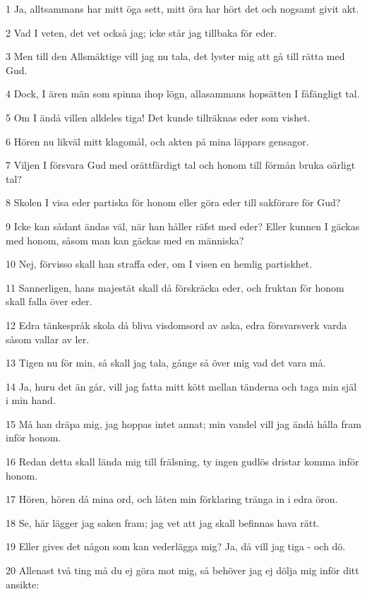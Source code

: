 \par 1 Ja, alltsammans har mitt öga sett, mitt öra har hört det och nogsamt givit akt.
\par 2 Vad I veten, det vet också jag; icke står jag tillbaka för eder.
\par 3 Men till den Allsmäktige vill jag nu tala, det lyster mig att gå till rätta med Gud.
\par 4 Dock, I ären män som spinna ihop lögn, allasammans hopsätten I fåfängligt tal.
\par 5 Om I ändå villen alldeles tiga! Det kunde tillräknas eder som vishet.
\par 6 Hören nu likväl mitt klagomål, och akten på mina läppars gensagor.
\par 7 Viljen I försvara Gud med orättfärdigt tal och honom till förmån bruka oärligt tal?
\par 8 Skolen I visa eder partiska för honom eller göra eder till sakförare för Gud?
\par 9 Icke kan sådant ändas väl, när han håller räfst med eder? Eller kunnen I gäckas med honom, såsom man kan gäckas med en människa?
\par 10 Nej, förvisso skall han straffa eder, om I visen en hemlig partiskhet.
\par 11 Sannerligen, hans majestät skall då förskräcka eder, och fruktan för honom skall falla över eder.
\par 12 Edra tänkespråk skola då bliva visdomsord av aska, edra försvarsverk varda såsom vallar av ler.
\par 13 Tigen nu för min, så skall jag tala, gånge så över mig vad det vara må.
\par 14 Ja, huru det än går, vill jag fatta mitt kött mellan tänderna och taga min själ i min hand.
\par 15 Må han dräpa mig, jag hoppas intet annat; min vandel vill jag ändå hålla fram inför honom.
\par 16 Redan detta skall lända mig till frälsning, ty ingen gudlös dristar komma inför honom.
\par 17 Hören, hören då mina ord, och låten min förklaring tränga in i edra öron.
\par 18 Se, här lägger jag saken fram; jag vet att jag skall befinnas hava rätt.
\par 19 Eller gives det någon som kan vederlägga mig? Ja, då vill jag tiga - och dö.
\par 20 Allenast två ting må du ej göra mot mig, så behöver jag ej dölja mig inför ditt ansikte:
